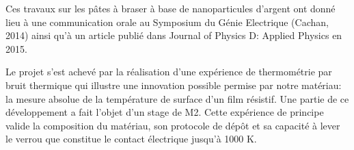 Ces travaux sur les pâtes à braser à base de nanoparticules d'argent ont donné lieu à une communication orale au Symposium du Génie Electrique (Cachan, 2014) ainsi qu'à un article publié dans Journal of Physics D: Applied Physics en 2015.

Le projet s'est achevé par la réalisation d'une expérience de thermométrie par bruit thermique qui illustre une innovation possible permise par notre matériau: la mesure absolue de la température de surface d'un film résistif. Une partie de ce développement a fait l'objet d'un stage de M2. Cette expérience de principe valide la composition du matériau, son protocole de dépôt et sa capacité à lever le verrou que constitue le contact électrique jusqu'à 1000 K. 
\fi